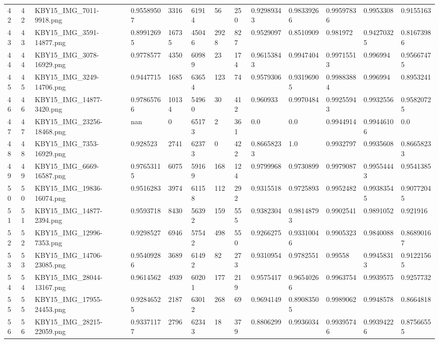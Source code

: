 \documentclass[11pt, a4paper, twoside]{report}
\begin{document}
\begin{longtable}[c]{@{}lllllllllllll@{}}
42 & 42 & KBY15\_IMG\_7011-9918.png & 0.95589507 & 3316 & 61914 & 56 & 250 & 0.92989343 & 0.98339266 & 0.99597836 & 0.9953308 & 0.9155163 \\
43 & 43 & KBY15\_IMG\_3591-14877.png & 0.89912695 & 16735 & 45046 & 2928 & 827 & 0.9529097 & 0.8510909 & 0.981972 & 0.94270325 & 0.81673986 \\
44 & 44 & KBY15\_IMG\_3078-16929.png & 0.9778577 & 4350 & 60989 & 23 & 174 & 0.96153843 & 0.9947404 & 0.99715513 & 0.996994 & 0.95667475 \\
45 & 45 & KBY15\_IMG\_3249-14706.png & 0.9447715 & 1685 & 63654 & 123 & 74 & 0.9579306 & 0.93196905 & 0.99883884 & 0.996994 & 0.8953241 \\
46 & 46 & KBY15\_IMG\_14877-3420.png & 0.97865766 & 10134 & 54960 & 30 & 412 & 0.960933 & 0.9970484 & 0.99255943 & 0.9932556 & 0.95820725 \\
47 & 47 & KBY15\_IMG\_23256-18468.png & nan & 0 & 65173 & 2 & 361 & 0.0 & 0.0 & 0.9944914 & 0.99446106 & 0.0 \\
48 & 48 & KBY15\_IMG\_7353-16929.png & 0.928523 & 2741 & 62373 & 0 & 422 & 0.86658233 & 1.0 & 0.9932797 & 0.9935608 & 0.86658233 \\
49 & 49 & KBY15\_IMG\_6669-16587.png & 0.97653115 & 6075 & 59169 & 168 & 124 & 0.9799968 & 0.9730899 & 0.9979087 & 0.99554443 & 0.9541385 \\
50 & 50 & KBY15\_IMG\_19836-16074.png & 0.9516283 & 3974 & 61158 & 112 & 292 & 0.9315518 & 0.9725893 & 0.9952482 & 0.99383545 & 0.90772045 \\
51 & 51 & KBY15\_IMG\_14877-2394.png & 0.9593718 & 8430 & 56392 & 159 & 555 & 0.9382304 & 0.98148793 & 0.9902541 & 0.9891052 & 0.921916 \\
52 & 52 & KBY15\_IMG\_12996-7353.png & 0.9298527 & 6946 & 57542 & 498 & 550 & 0.9266275 & 0.93310046 & 0.9905323 & 0.9840088 & 0.86890167 \\
53 & 53 & KBY15\_IMG\_14706-23085.png & 0.95409286 & 3689 & 61492 & 82 & 273 & 0.9310954 & 0.9782551 & 0.99558 & 0.99458313 & 0.91221565 \\
54 & 54 & KBY15\_IMG\_28044-13167.png & 0.9614562 & 4939 & 60201 & 177 & 219 & 0.9575417 & 0.96540266 & 0.9963754 & 0.9939575 & 0.9257732 \\
55 & 55 & KBY15\_IMG\_17955-24453.png & 0.92846525 & 2187 & 63012 & 268 & 69 & 0.9694149 & 0.89083505 & 0.9989062 & 0.9948578 & 0.8664818 \\
56 & 56 & KBY15\_IMG\_28215-22059.png & 0.93371177 & 2796 & 62343 & 18 & 379 & 0.8806299 & 0.9936034 & 0.99395746 & 0.99394226 & 0.87566555 \\

\end{longtable}
\end{document}
